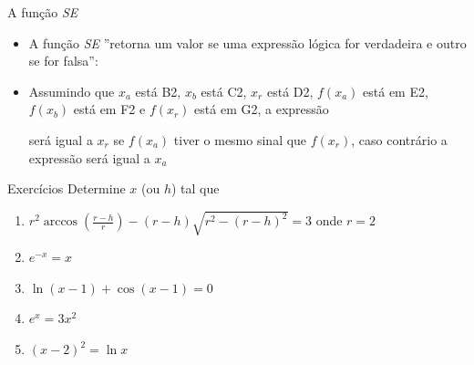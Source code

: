 \begin{frame}{A função \textit{SE}}
    \begin{itemize}
        \item A função \textit{SE} ''retorna um valor se uma expressão lógica for verdadeira e outro se for falsa'':
            \begin{center}
                \vspace{1em}
            \end{center}
        \item Assumindo que \(x_a\) está B2, \(x_b\) está C2, \(x_r\) está D2, \(f(x_a)\) está em E2, \(f(x_b)\) está em F2 e \(f(x_r)\) está em G2, a expressão
            \begin{center}
                \vspace{1em}
            \end{center}
            será igual a \(x_r\) se \(f(x_a)\) tiver o mesmo sinal que \(f(x_r)\), caso contrário a expressão será igual a \(x_a\)
    \end{itemize}
\end{frame}

\begin{frame}[label=chant]{Exercícios}
    Determine \(x\) (ou \(h\)) tal que
    \begin{enumerate}
        \item \(r^2 \arccos{\left(\frac{r-h}{r}\right)}-(r-h)\sqrt{r^2-(r-h)^2}=3\) onde \(r=2\)
        \item \(e^{-x}=x\)
        \item \(\ln(x-1) + \cos(x-1)=0 \)
        \item \(e^x=3x^2\)
        \item \((x-2)^2=\ln x\)
    \end{enumerate}
\end{frame}

